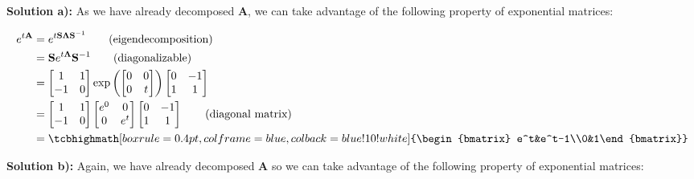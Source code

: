 \documentclass{article}
\begin{document}
\noindent\textbf{Solution a):} As we have already decomposed $\mathbf{A}$, we can take advantage of the following property of exponential matrices:

\begin{align*}
    e^{t\mathbf{A}}&=e^{t\mathbf{S\Lambda S}^{-1}}\tag{eigendecomposition}\\
    &=\mathbf{S}e^{t\mathbf{\Lambda}}\mathbf{S}^{-1}\tag{diagonalizable}\\
    &=\begin{bmatrix} 1&1\\-1&0\end{bmatrix}\exp{\left(\begin{bmatrix}
        0&0\\0&t
    \end{bmatrix}\right)}\begin{bmatrix} 0&-1\\1&1\end{bmatrix}\\
    &=\begin{bmatrix} 1&1\\-1&0\end{bmatrix}\begin{bmatrix}
        e^0&0\\0&e^t
    \end{bmatrix}\begin{bmatrix} 0&-1\\1&1\end{bmatrix}\tag{diagonal matrix}\\
    &=\tcbhighmath[boxrule=0.4pt,colframe=blue,colback=blue!10!white]{\begin{bmatrix} e^t&e^t-1\\0&1\end{bmatrix}}
\end{align*}
\medskip

\noindent\textbf{Solution b):} Again, we have already decomposed $\mathbf{A}$ so we can take advantage of the following property of exponential matrices:
\end{document}
